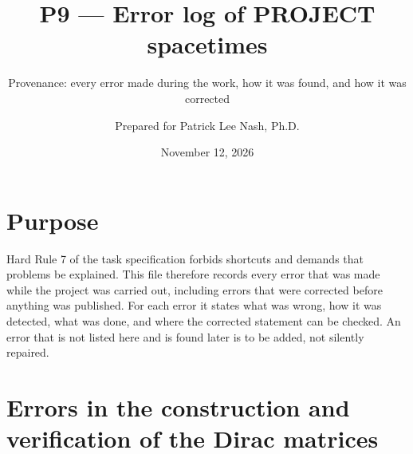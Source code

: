 \documentclass[
  10pt,
]{article}
\title{P9 --- Error log of PROJECT spacetimes}
\subtitle{Provenance: every error made during the work, how it was
found, and how it was corrected}
\author{Prepared for Patrick Lee Nash, Ph.D.}
\date{November 12, 2026}
\begin{document}
\maketitle

\hypertarget{purpose}{%
\section{Purpose}\label{purpose}}

Hard Rule 7 of the task specification forbids shortcuts and demands that
problems be explained. This file therefore records every error that was
made while the project was carried out, including errors that were
corrected before anything was published. For each error it states what
was wrong, how it was detected, what was done, and where the corrected
statement can be checked. An error that is not listed here and is found
later is to be added, not silently repaired.

\hypertarget{errors-in-the-construction-and-verification-of-the-dirac-matrices}{%
\section{Errors in the construction and verification of the Dirac
matrices}\label{errors-in-the-construction-and-verification-of-the-dirac-matrices}}
\end{document}
